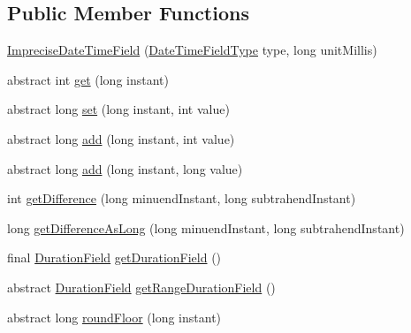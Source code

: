 \subsection*{Public Member Functions}
\begin{DoxyCompactItemize}
\item 
\hyperlink{classorg_1_1joda_1_1time_1_1field_1_1_imprecise_date_time_field_af69b95674fa550dbef13d0b78bb7c7a6}{Imprecise\-Date\-Time\-Field} (\hyperlink{classorg_1_1joda_1_1time_1_1_date_time_field_type}{Date\-Time\-Field\-Type} type, long unit\-Millis)
\item 
abstract int \hyperlink{classorg_1_1joda_1_1time_1_1field_1_1_imprecise_date_time_field_ab9b45f89dd2abe6df0e28178810d0134}{get} (long instant)
\item 
abstract long \hyperlink{classorg_1_1joda_1_1time_1_1field_1_1_imprecise_date_time_field_afbe1ae74dab8eb83f46b9c715742cb82}{set} (long instant, int value)
\item 
abstract long \hyperlink{classorg_1_1joda_1_1time_1_1field_1_1_imprecise_date_time_field_a298039c9292cddbce5c5acd73eb56164}{add} (long instant, int value)
\item 
abstract long \hyperlink{classorg_1_1joda_1_1time_1_1field_1_1_imprecise_date_time_field_aabe3534cc29e991fdb055a7bf19473a2}{add} (long instant, long value)
\item 
int \hyperlink{classorg_1_1joda_1_1time_1_1field_1_1_imprecise_date_time_field_a8e135d7d290c1ecb0e3c907ef410c260}{get\-Difference} (long minuend\-Instant, long subtrahend\-Instant)
\item 
long \hyperlink{classorg_1_1joda_1_1time_1_1field_1_1_imprecise_date_time_field_acd79dbc9bda61722c9612c89fcac2781}{get\-Difference\-As\-Long} (long minuend\-Instant, long subtrahend\-Instant)
\item 
final \hyperlink{classorg_1_1joda_1_1time_1_1_duration_field}{Duration\-Field} \hyperlink{classorg_1_1joda_1_1time_1_1field_1_1_imprecise_date_time_field_abcde69fb4106ac0fa7d9a25794877a24}{get\-Duration\-Field} ()
\item 
abstract \hyperlink{classorg_1_1joda_1_1time_1_1_duration_field}{Duration\-Field} \hyperlink{classorg_1_1joda_1_1time_1_1field_1_1_imprecise_date_time_field_a4fbf563d91df852383407e5cf8beeef6}{get\-Range\-Duration\-Field} ()
\item 
abstract long \hyperlink{classorg_1_1joda_1_1time_1_1field_1_1_imprecise_date_time_field_a003f001fe5680f4a5f4cb2c61d4ad6d7}{round\-Floor} (long instant)
\end{DoxyCompactItemize}
